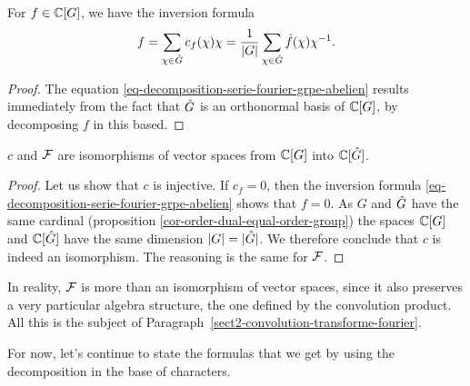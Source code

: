 \begin{prop}
\label{prop-decomposition-serie-fourier}
  For $ f \in \mathbb{C}[G]$, we have the inversion formula
\begin{equation}
\label{eq-decomposition-serie-fourier-grpe-abelien}
f = \sum_{\chi \in \hat{G}}{c_f(\chi) \chi} = \frac{1}{|G|} \sum_{\chi \in \hat{G}}{\hat{f}(\chi) \chi^{-1}}.
\end{equation}

\end{prop}
\begin{proof}
The equation \eqref{eq-decomposition-serie-fourier-grpe-abelien} results immediately from the fact that $\hat{G}$ is an orthonormal basis of $\mathbb{C}[G]$, by decomposing $f$ in this based.
\end{proof}


\begin{prop}
$ c $ and $\mathcal{F} $ are isomorphisms of vector spaces from $\mathbb{C}[G]$ into $\mathbb{C}[\hat{G}]$.
\end{prop}
\begin{proof}
Let us show that $ c $ is injective. If $ c_f = 0 $, then the inversion formula \eqref{eq-decomposition-serie-fourier-grpe-abelien} shows that $ f = 0 $. As $G$ and $\hat{G}$ have the same cardinal (proposition \ref{cor-order-dual-equal-order-group}) the spaces $\mathbb{C}[G]$ and $\mathbb{C}[\hat{G}]$ have the same dimension $|G| = |\hat{G}|$. We therefore conclude that $ c $ is indeed an isomorphism. The reasoning is the same for $\mathcal{F} $.
\end{proof}


\begin{rem}
In reality, $\mathcal{F} $ is more than an isomorphism of vector spaces, since it also preserves a very particular algebra structure, the one defined by the convolution product. All this is the subject of Paragraph~\ref{sect2-convolution-transforme-fourier}.
\end{rem}
For now, let's continue to state the formulas that we get by using the decomposition in the base of characters.

